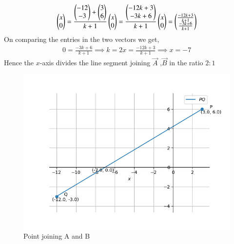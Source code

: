 \documentclass[journal]{IEEEtran}
\begin{document}
\begin{align}
	\begin{pmatrix}x \\ 0\end{pmatrix} = \frac{\begin{pmatrix}-12\\-3\end{pmatrix} + \begin{pmatrix}3\\6\end{pmatrix}}{k+1}
	\begin{pmatrix}x\\0\end{pmatrix} = \frac{\begin{pmatrix}-12k+3\\-3k+6\end{pmatrix}}{k+1}
	\begin{pmatrix}x\\0\end{pmatrix} = \begin{pmatrix}\frac{-12k+3}{k+1}\\ \frac{-3k+6}{k+1}\end{pmatrix}
\end{align}
On comparing the entries in the two vectors we get, 
\begin{align}
	0 = \frac{-3k+6}{k+1} \implies k = 2
	x = \frac{-12k+3}{k+1} \implies x = -7
\end{align}
Hence the $x$-axis divides the line segment joining $\vec{A}$ ,$\vec{B}$ in the ratio $2:1$
\begin{figure}[h!]
   \centering
   \includegraphics[width=0.7\linewidth]{figs/fig.png}
   \caption{Point joining A and B}
   \label{stemplot}
\end{figure}
\end{document}
